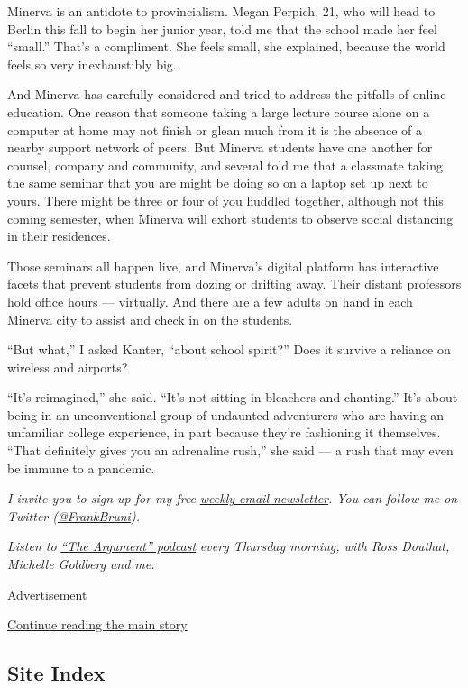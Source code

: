 Minerva is an antidote to provincialism. Megan Perpich, 21, who will
head to Berlin this fall to begin her junior year, told me that the
school made her feel ``small.'' That's a compliment. She feels small,
she explained, because the world feels so very inexhaustibly big.

And Minerva has carefully considered and tried to address the pitfalls
of online education. One reason that someone taking a large lecture
course alone on a computer at home may not finish or glean much from it
is the absence of a nearby support network of peers. But Minerva
students have one another for counsel, company and community, and
several told me that a classmate taking the same seminar that you are
might be doing so on a laptop set up next to yours. There might be three
or four of you huddled together, although not this coming semester, when
Minerva will exhort students to observe social distancing in their
residences.

Those seminars all happen live, and Minerva's digital platform has
interactive facets that prevent students from dozing or drifting away.
Their distant professors hold office hours --- virtually. And there are
a few adults on hand in each Minerva city to assist and check in on the
students.

``But what,'' I asked Kanter, ``about school spirit?'' Does it survive a
reliance on wireless and airports?

``It's reimagined,'' she said. ``It's not sitting in bleachers and
chanting.'' It's about being in an unconventional group of undaunted
adventurers who are having an unfamiliar college experience, in part
because they're fashioning it themselves. ``That definitely gives you an
adrenaline rush,'' she said --- a rush that may even be immune to a
pandemic.

\emph{I invite you to sign up for my free}
\href{https://www.nytimes.com/newsletters/frank-bruni}{\emph{weekly
email newsletter}}\emph{. You can follow me on Twitter
(}\href{https://twitter.com/FrankBruni}{\emph{@FrankBruni}}\emph{).}

\emph{Listen to}
\href{https://www.nytimes.com/column/the-argument}{\emph{``The
Argument'' podcast}} \emph{every Thursday morning, with Ross Douthat,
Michelle Goldberg and me.}

Advertisement

\protect\hyperlink{after-bottom}{Continue reading the main story}

\hypertarget{site-index}{%
\subsection{Site Index}\label{site-index}}

